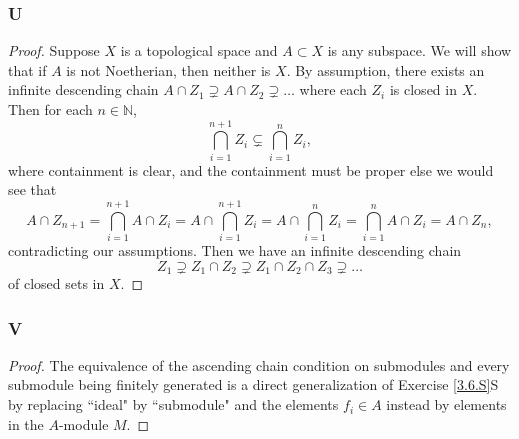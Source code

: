 \documentclass{article}
\newcommand{\N}{\mathbb{N}}
\theoremstyle{definition} %
\begin{document}
\subsubsection{U}\label{3.6.U}
\begin{proof}
    Suppose $X$ is a topological space and $A\subset X$ is any subspace. We will show that if $A$ is not Noetherian, then neither is $X$. By assumption, there exists an infinite descending chain $A \cap Z_1 \supsetneq A\cap Z_2 \supsetneq \dots$ where each $Z_i$ is closed in $X$. %
    Then for each $n\in \N$,
    \[
    \bigcap_{i=1}^{n+1} Z_i\subsetneq \bigcap_{i=1}^n Z_i,
    \]
    where containment is clear, and the containment must be proper else we would see that
    \[
    A\cap Z_{n+1}= \bigcap_{i=1}^{n+1} A \cap Z_i = A \cap \bigcap_{i=1}^{n+1} Z_i = A \cap \bigcap_{i=1}^n Z_i = \bigcap_{i=1}^n A\cap Z_i = A\cap Z_n,
    \]
    contradicting our assumptions. Then we have an infinite descending chain
    \[
    Z_1 \supsetneq Z_1 \cap Z_2 \supsetneq Z_1 \cap Z_2 \cap Z_3 \supsetneq \dots
    \]
    of closed sets in $X$.
\end{proof}
\subsubsection{V}\label{3.6.V}
\begin{proof}
    The equivalence of the ascending chain condition on submodules and every submodule being finitely generated is a direct generalization of Exercise \ref{3.6.S}S by replacing ``ideal" by ``submodule" and the elements $f_i \in A$ instead by elements in the $A$-module $M$.
\end{proof}
\end{document}

